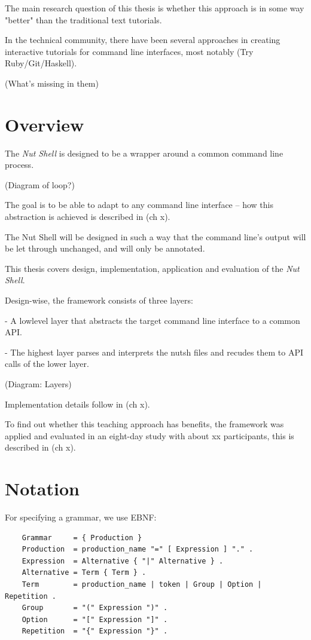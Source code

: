 \documentclass[a4paper,twoside,abstract=on,cleardoublepage=empty,numbers=noenddot,toc=bib]{scrreprt}
\begin{document}
The main research question of this thesis is whether this approach is in some way "better" than the traditional text tutorials.

In the technical community, there have been several approaches in creating interactive tutorials for command line interfaces, most notably (Try Ruby/Git/Haskell).

(What's missing in them)

\section{Overview}

The \emph{Nut Shell} is designed to be a wrapper around a common command line process.

(Diagram of loop?)

The goal is to be able to adapt to any command line interface -- how this abstraction is achieved is described in (ch x).

The Nut Shell will be designed in such a way that the command line's output will be let through unchanged, and will only be annotated.

This thesis covers design, implementation, application and evaluation of the \emph{Nut Shell}.

Design-wise, the framework consists of three layers:

- A lowlevel layer that abstracts the target command line interface to a common API.

- The highest layer parses and interprets the nutsh files and recudes them to API calls of the lower layer.

(Diagram: Layers)

Implementation details follow in (ch x).

To find out whether this teaching approach has benefits, the framework was applied and evaluated in an eight-day study with about xx participants, this is described in (ch x).

\section{Notation}

For specifying a grammar, we use EBNF:

\begin{lstlisting}
    Grammar     = { Production }
    Production  = production_name "=" [ Expression ] "." .
    Expression  = Alternative { "|" Alternative } .
    Alternative = Term { Term } .
    Term        = production_name | token | Group | Option | Repetition .
    Group       = "(" Expression ")" .
    Option      = "[" Expression "]" .
    Repetition  = "{" Expression "}" .
\end{lstlisting}
\end{document}
